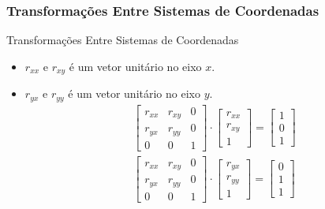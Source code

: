 \documentclass{beamer}
\begin{document}
\begin{frame}
\frametitle{Transformações Entre Sistemas de Coordenadas}

	\begin{block}{Transformações Entre Sistemas de Coordenadas}
		\begin{itemize}
			\item $r_{xx}$ e $r_{xy}$ é um vetor unitário no eixo $x$.
			\item $r_{yx}$ e $r_{yy}$ é um vetor unitário no eixo $y$.	
			\begin{eqnarray*}
					\begin{bmatrix}
						r_{xx}	& r_{xy}  	& 0 \\
						r_{yx} 	& r_{yy}		& 0 \\
						0	& 0	& 1
					\end{bmatrix} \cdot 
					\begin{bmatrix}
						r_{xx} \\
						r_{xy}\\
						1
					\end{bmatrix}
					= \begin{bmatrix}
						1 \\
						0\\
						1
					\end{bmatrix} \\
					\begin{bmatrix}
						r_{xx}	& r_{xy}  	& 0 \\
						r_{yx} 	& r_{yy}		& 0 \\
						0	& 0	& 1
					\end{bmatrix} \cdot 
					\begin{bmatrix}
						r_{yx} \\
						r_{yy}\\
						1
					\end{bmatrix}
					= \begin{bmatrix}
						0 \\
						1\\
						1
					\end{bmatrix}
				\end{eqnarray*}			
		\end{itemize}
	\end{block}
\end{frame}
\end{document}
